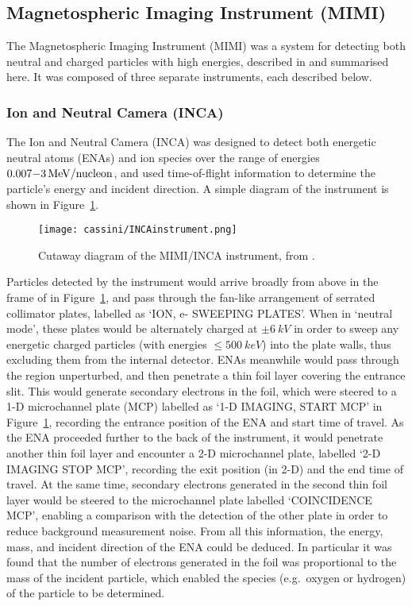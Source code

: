 \subsection{Magnetospheric Imaging Instrument (MIMI)}
The Magnetospheric Imaging Instrument (MIMI) was a system for detecting both neutral and charged particles with high energies, described in \citet{krimigis2004} and summarised here. It was composed of three separate instruments, each described below.
\subsubsection{Ion and Neutral Camera (INCA)}
The Ion and Neutral Camera (INCA) was designed to detect both energetic neutral atoms (ENAs) and ion species over the range of energies $0.007{\--}\SI{3}{MeV/nucleon}$, and used time-of-flight information to determine the particle's energy and incident direction. A simple diagram of the instrument is shown in Figure~\ref{cassini:fig:INCAinstrument}.

\begin{figure}
\centering
\noindent\texttt{[image: cassini/INCAinstrument.png]}
\caption[Diagram of the MIMI/INCA instrument.]{Cutaway diagram of the MIMI/INCA instrument, from \citet{krimigis2004}.}
\label{cassini:fig:INCAinstrument}
\end{figure}

Particles detected by the instrument would arrive broadly from above in the frame of  in Figure~\ref{cassini:fig:INCAinstrument}, and pass through the fan-like arrangement of serrated collimator plates, labelled as `ION, e- SWEEPING PLATES'. When in `neutral mode', these plates would be alternately charged at $\pm\SI{6}{kV}$ in order to sweep any energetic charged particles (with energies $\leq \SI{500}{keV}$) into the plate walls, thus excluding them from the internal detector. ENAs meanwhile would pass through the region unperturbed, and then penetrate a thin foil layer covering  the entrance slit. This would generate secondary electrons in the foil, which were steered to a 1-D microchannel plate (MCP) labelled as `1-D IMAGING, START MCP' in  Figure~\ref{cassini:fig:INCAinstrument}, recording the entrance position of the ENA and start time of travel. As the ENA proceeded further to the back of the instrument, it would penetrate another thin foil layer and  encounter a 2-D microchannel plate, labelled `2-D IMAGING STOP MCP', recording the exit position (in 2-D) and the end time of travel. At the same time, secondary electrons generated in the second thin foil layer would be steered to the microchannel plate  labelled `COINCIDENCE MCP', enabling a comparison with  the detection of the other plate in order to reduce background measurement noise. From all this information, the energy, mass, and incident direction of the ENA could be deduced. In particular it was found that the number of electrons generated in the foil was proportional to the mass of  the incident particle, which enabled the species (e.g.\ oxygen or hydrogen) of the particle to be determined. 

